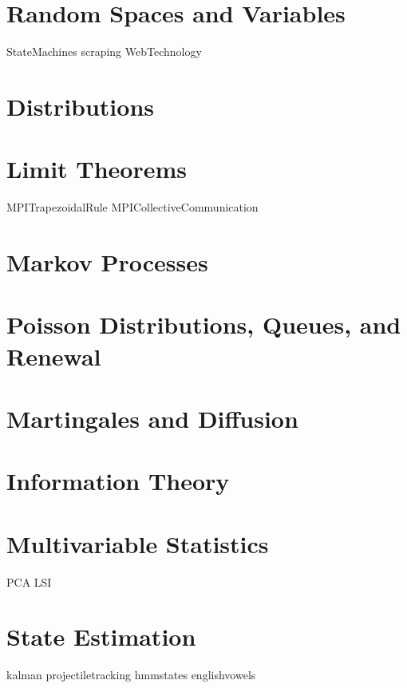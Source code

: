 \documentclass[nociteref]{SIAM-GH-book}
\begin{document}
\part{Random Spaces and Variables}

{StateMachines}
{scraping}
{WebTechnology}

\part{Distributions}

\part{Limit Theorems}
{MPITrapezoidalRule}
{MPICollectiveCommunication}


\part{Markov Processes}

\part{Poisson Distributions, Queues, and Renewal}

\part{Martingales and Diffusion}

\part{Information Theory}

\part{Multivariable Statistics}
{PCA}
{LSI}

\part{State Estimation}
{kalman}
{projectiletracking}
{hmmstates}
{englishvowels}
\end{document}
